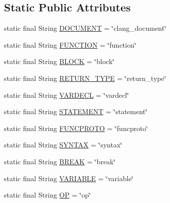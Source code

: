 \subsection*{Static Public Attributes}
\begin{DoxyCompactItemize}
\item 
static final String \mbox{\hyperlink{classghidra_1_1app_1_1decompiler_1_1_clang_x_m_l_a00af7aa5bbc44f56bf7cc683cd264d14}{D\+O\+C\+U\+M\+E\+NT}} = \char`\"{}clang\+\_\+document\char`\"{}
\item 
static final String \mbox{\hyperlink{classghidra_1_1app_1_1decompiler_1_1_clang_x_m_l_a2f4edc3bde043ca9fb21ab76932f40d0}{F\+U\+N\+C\+T\+I\+ON}} = \char`\"{}function\char`\"{}
\item 
static final String \mbox{\hyperlink{classghidra_1_1app_1_1decompiler_1_1_clang_x_m_l_a4dba49d9df3bfebc052cffc84a22997b}{B\+L\+O\+CK}} = \char`\"{}block\char`\"{}
\item 
static final String \mbox{\hyperlink{classghidra_1_1app_1_1decompiler_1_1_clang_x_m_l_a419fbc732b6b446bde34834c74820e86}{R\+E\+T\+U\+R\+N\+\_\+\+T\+Y\+PE}} = \char`\"{}return\+\_\+type\char`\"{}
\item 
static final String \mbox{\hyperlink{classghidra_1_1app_1_1decompiler_1_1_clang_x_m_l_a6f30091426625c998ffa90c5071b766d}{V\+A\+R\+D\+E\+CL}} = \char`\"{}vardecl\char`\"{}
\item 
static final String \mbox{\hyperlink{classghidra_1_1app_1_1decompiler_1_1_clang_x_m_l_adb25e9caec2d1c3fee8a69f17afdcb7e}{S\+T\+A\+T\+E\+M\+E\+NT}} = \char`\"{}statement\char`\"{}
\item 
static final String \mbox{\hyperlink{classghidra_1_1app_1_1decompiler_1_1_clang_x_m_l_a2a1d3db7e28fa2ae2c1a725dd46532f7}{F\+U\+N\+C\+P\+R\+O\+TO}} = \char`\"{}funcproto\char`\"{}
\item 
static final String \mbox{\hyperlink{classghidra_1_1app_1_1decompiler_1_1_clang_x_m_l_a29750a918e8f45710d7ede48f8e3e85b}{S\+Y\+N\+T\+AX}} = \char`\"{}syntax\char`\"{}
\item 
static final String \mbox{\hyperlink{classghidra_1_1app_1_1decompiler_1_1_clang_x_m_l_ae051fc1bf8a63e8ada403d8b77ff9f60}{B\+R\+E\+AK}} = \char`\"{}break\char`\"{}
\item 
static final String \mbox{\hyperlink{classghidra_1_1app_1_1decompiler_1_1_clang_x_m_l_a0a621055ba5c860aa5d05cd5ff466080}{V\+A\+R\+I\+A\+B\+LE}} = \char`\"{}variable\char`\"{}
\item 
static final String \mbox{\hyperlink{classghidra_1_1app_1_1decompiler_1_1_clang_x_m_l_a9f210df309a1ba93d23728a7d3eb156c}{OP}} = \char`\"{}op\char`\"{}

\end{DoxyCompactItemize}
